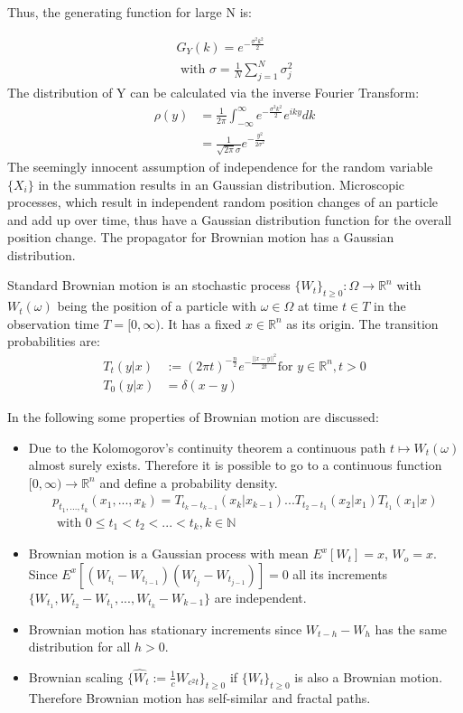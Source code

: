 \documentclass[
  a4paper,BCOR10mm,oneside,
  bibtotoc,idxtotoc,
  headsepline,footsepline,%
  fleqn,openbib
]{scrbook}
\begin{document}
Thus, the generating function for large N is:

\begin{align}
 G_Y(k)=e^{- \frac{\sigma^2 k^2}{2}} \\ \nonumber
 \text{ with } \sigma =  \frac{1}{N} \sum_{j=1}^N \sigma_j^2 
\end{align}
The distribution of Y can be calculated via the inverse Fourier Transform:
\begin{align}
 \rho(y) &=\frac{1}{2 \pi} \int_{-\infty}^{\infty} e^{- \frac{\sigma^2 k^2}{2}} e^{i k y} dk \\  
 &=\frac{1}{\sqrt{2 \pi} \sigma } e^{-\frac{y^2}{2 \sigma^2}}
\end{align}
The seemingly innocent assumption of independence for the random variable $\{X_i\}$ in the summation results in an Gaussian distribution. Microscopic processes, which result in independent random position changes of an particle and add up over time, thus have a Gaussian distribution function for the overall position change. The propagator for Brownian motion has a Gaussian distribution.
\begin{mydef}
Standard Brownian motion is an stochastic process $ \{ W_t \}_{t\geq0}: \Omega \rightarrow \mathbb{R}^n$ with $ W_t(\omega)$ being the position of a particle with $\omega \in \Omega$ at time $t \in T$ in the observation time $T =[0, \infty)$. It has a fixed $x \in \mathbb{R}^n$ as its origin. The transition probabilities are: 
\begin{align}
T_{t}(y|x) & := (2 \pi t)^{- \frac{n}{2}} e^{- \frac{||x-y||^2}{2 t}} \text{for } y \in \mathbb{R}^n, t>0 \\ \nonumber
T_{0}(y|x) & = \delta(x-y) 
\end{align}
\end{mydef}
In the following some properties of Brownian motion are discussed:\\
\begin{itemize}
 \item Due to the Kolomogorov's continuity theorem a continuous path $ t \mapsto W_t(\omega)$ almost surely exists. Therefore it is possible to go to a continuous function $[0,\infty) \rightarrow \mathbb{R}^n$ and define a probability density.
\begin{align*}
p_{t_1,...,t_k}(x_1,...,x_k)  =T_{t_k -t_{k-1}}(x_k|x_{k-1}) ... T_{t_2 - t_1}(x_2|x_1) T_{t_1}(x_1|x)  \\
\text{ with }  0\leq t_1 < t_2 < ...< t_k,k \in \mathbb{N}
\end{align*}
\item Brownian motion is a Gaussian process with mean $E^x[W_t]=x$, $W_o=x$.
Since $ E^x[(W_{t_i}-W_{t_{i-1}})(W_{t_j}-W_{t_{j-1}})]=0 $  all its increments $\{W_{t_1},W_{t_2}-W_{t_1},...,W_{t_k}-W_{k-1}\}$ are independent.

\item Brownian motion has stationary increments since ${W_{t-h}-W_{h}}$ has the same distribution for all $h>0$.

\item Brownian scaling $\{\hat{W}_t := \frac{1}{c} W_{c^2 t} \}_{t\geq0}$ if $\{W_t\}_{t \geq 0}$  is also a Brownian motion. Therefore Brownian motion has self-similar and fractal paths.
\end{itemize}
\end{document}
